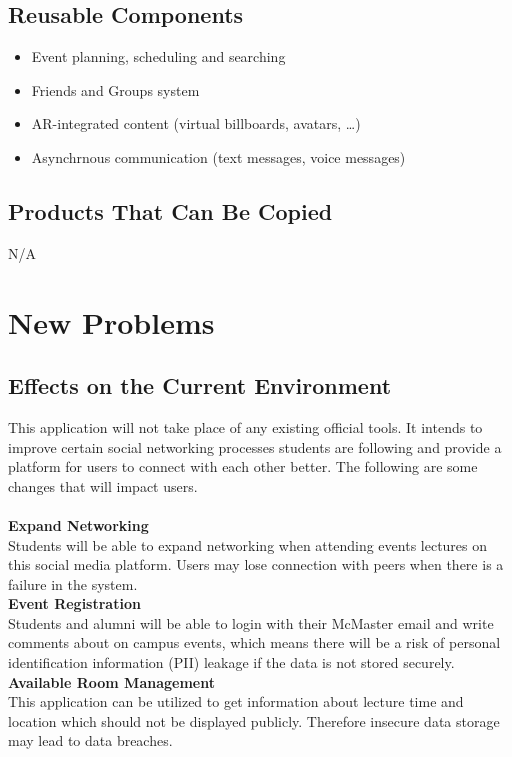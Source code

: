 \documentclass[12pt]{article}
\begin{document}
\subsection{Reusable Components}
\begin{itemize}
  \item Event planning, scheduling and searching
  \item Friends and Groups system
  \item AR-integrated content (virtual billboards, avatars, \dots)
  \item Asynchrnous communication (text messages, voice messages)
\end{itemize}
\subsection{Products That Can Be Copied}
N/A
\section{New Problems}
\subsection{Effects on the Current Environment}

This application will not take place of any existing official tools. It intends to improve certain social networking processes students are following and provide a platform for users to connect with each other better. The following are some changes that will impact users.\\
\noindent\\
\textbf{Expand Networking}\\
Students will be able to expand networking when attending events lectures on this social media platform. Users may lose connection with peers when there is a failure in the system. 
\noindent\\
\textbf{Event Registration}\\
Students and alumni will be able to login with their McMaster email and write comments about on campus events, which means there will be a risk of personal identification information (PII) leakage if the data is not stored securely.
\noindent\\
\textbf{Available Room Management}\\
This application can be utilized to get information about lecture time and location which should not be displayed publicly. Therefore insecure data storage may lead to data breaches.
\end{document}
